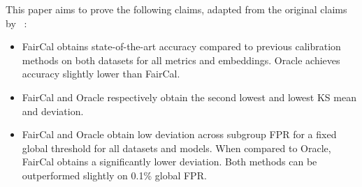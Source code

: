 
This paper aims to prove the following claims, adapted from the original claims by \citeauthor{salvador2022faircal}~\cite{salvador2022faircal}:
\begin{itemize}
    \item FairCal obtains state-of-the-art accuracy compared to previous calibration methods on both datasets for all metrics and embeddings. Oracle achieves accuracy slightly lower than FairCal.
    \item FairCal and Oracle respectively obtain the second lowest and lowest KS mean and deviation.
    \item FairCal and Oracle obtain low deviation across subgroup FPR for a fixed global threshold for all datasets and models. When compared to Oracle, FairCal obtains a significantly lower deviation. Both methods can be outperformed slightly on 0.1\% global FPR.
\end{itemize}

